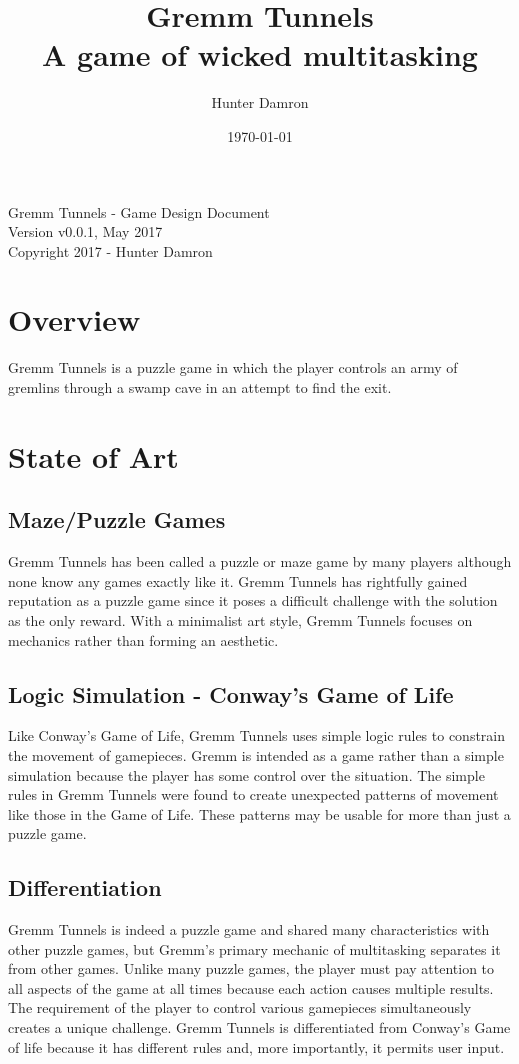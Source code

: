 \documentclass{scrreprt}
\title{
	Gremm Tunnels \\
    \large A game of wicked multitasking
}
\author{Hunter Damron}
\date{\today}
\begin{document}
	\maketitle
	
	\null\vfill
	\noindent
	Gremm Tunnels - Game Design Document \\
	Version v0.0.1, May 2017 \\
	Copyright 2017 - Hunter Damron \\
	\newpage

	\tableofcontents
	\newpage
	
	\chapter{Overview}
		Gremm Tunnels is a puzzle game in which the player controls an army of gremlins through a swamp cave in an attempt to find the exit. 
	
	\chapter{State of Art}
		
		\section{Maze/Puzzle Games}
			Gremm Tunnels has been called a puzzle or maze game by many players although none know any games exactly like it. Gremm Tunnels has rightfully gained reputation as a puzzle game since it poses a difficult challenge with the solution as the only reward. With a minimalist art style, Gremm Tunnels focuses on mechanics rather than forming an aesthetic.
			
		\section{Logic Simulation - Conway's Game of Life}
			Like Conway's Game of Life, Gremm Tunnels uses simple logic rules to constrain the movement of gamepieces. Gremm is intended as a game rather than a simple simulation because the player has some control over the situation. The simple rules in Gremm Tunnels were found to create unexpected patterns of movement like those in the Game of Life. These patterns may be usable for more than just a puzzle game.
		
		\section{Differentiation}
			Gremm Tunnels is indeed a puzzle game and shared many characteristics with other puzzle games, but Gremm's primary mechanic of multitasking separates it from other games. Unlike many puzzle games, the player must pay attention to all aspects of the game at all times because each action causes multiple results. The requirement of the player to control various gamepieces simultaneously creates a unique challenge. Gremm Tunnels is differentiated from Conway's Game of life because it has different rules and, more importantly, it permits user input.
	
\end{document}
